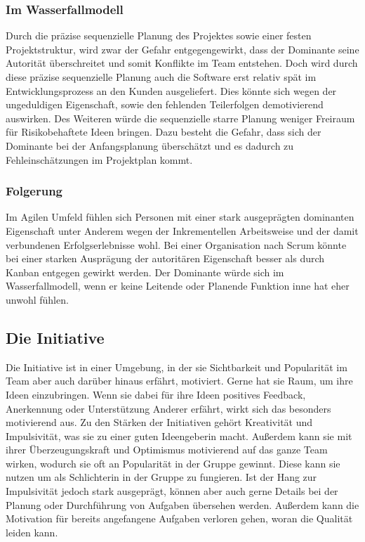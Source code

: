 \documentclass[twocolumn,10pt]{asme2ej}
\begin{document}
\subsubsection{Im Wasserfallmodell}
Durch die präzise sequenzielle Planung des Projektes sowie einer festen Projektstruktur, wird zwar der Gefahr entgegengewirkt, dass der Dominante seine Autorität überschreitet und somit Konflikte im Team entstehen. Doch wird durch diese präzise sequenzielle Planung auch die Software erst relativ spät im Entwicklungsprozess an den Kunden ausgeliefert. Dies könnte sich wegen der ungeduldigen Eigenschaft, sowie den fehlenden Teilerfolgen demotivierend auswirken. Des Weiteren würde die sequenzielle starre Planung weniger Freiraum für Risikobehaftete Ideen bringen. Dazu besteht die Gefahr, dass sich der Dominante bei der Anfangsplanung überschätzt und es dadurch zu Fehleinschätzungen im Projektplan kommt.

\subsubsection{Folgerung}
Im Agilen Umfeld fühlen sich Personen mit einer stark ausgeprägten dominanten Eigenschaft unter Anderem wegen der Inkrementellen Arbeitsweise und der damit verbundenen Erfolgserlebnisse wohl. Bei einer Organisation nach Scrum könnte bei einer starken Ausprägung der autoritären Eigenschaft besser als durch Kanban entgegen gewirkt werden. Der Dominante würde sich im Wasserfallmodell, wenn er keine Leitende oder Planende Funktion inne hat eher unwohl fühlen.

\subsection{Die Initiative}
Die Initiative ist in einer Umgebung, in der sie Sichtbarkeit und Popularität im Team aber auch darüber hinaus erfährt, motiviert. Gerne hat sie Raum, um ihre Ideen einzubringen. Wenn sie dabei für ihre Ideen positives Feedback, Anerkennung oder Unterstützung Anderer erfährt, wirkt sich das besonders motivierend aus. Zu den Stärken der Initiativen gehört Kreativität und Impulsivität, was sie zu einer guten Ideengeberin macht. Außerdem kann sie mit ihrer Überzeugungskraft und Optimismus motivierend auf das ganze Team wirken, wodurch sie oft an Popularität in der Gruppe gewinnt. Diese kann sie nutzen um als Schlichterin in der Gruppe zu fungieren. Ist der Hang zur Impulsivität jedoch stark ausgeprägt, können aber auch gerne Details bei der Planung oder Durchführung von Aufgaben übersehen werden. Außerdem kann die Motivation für bereits angefangene Aufgaben verloren gehen, woran die Qualität leiden kann.
\end{document}
